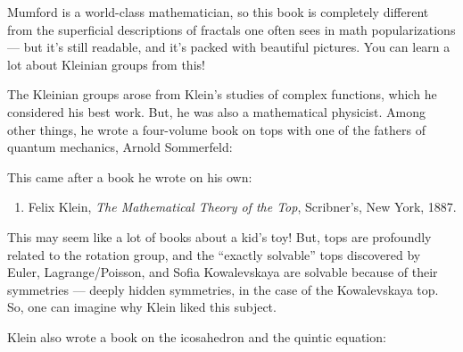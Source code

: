 \documentclass{article}
\def\tightlist{}
\renewcommand{\texttt}[1]{%
  \begingroup
  \ttfamily
  \begingroup\lccode`~=`/\lowercase{\endgroup\def~}{/\discretionary{}{}{}}%
  \begingroup\lccode`~=`[\lowercase{\endgroup\def~}{[\discretionary{}{}{}}%
  \begingroup\lccode`~=`.\lowercase{\endgroup\def~}{.\discretionary{}{}{}}%
  \catcode`/=\active\catcode`[=\active\catcode`.=\active
  \scantokens{#1\noexpand}%
  \endgroup
}
\begin{document}
Mumford is a world-class mathematician, so this book is completely
different from the superficial descriptions of fractals one often sees
in math popularizations --- but it's still readable, and it's packed
with beautiful pictures. You can learn a lot about Kleinian groups from
this!

The Kleinian groups arose from Klein's studies of complex functions,
which he considered his best work. But, he was also a mathematical
physicist. Among other things, he wrote a four-volume book on tops with
one of the fathers of quantum mechanics, Arnold Sommerfeld:


This came after a book he wrote on his own:

\begin{enumerate}
\def\labelenumi{\arabic{enumi})}
\setcounter{enumi}{4}
\tightlist
\item
  Felix Klein, \emph{The Mathematical Theory of the Top}, Scribner's,
  New York, 1887.
\end{enumerate}

This may seem like a lot of books about a kid's toy! But, tops are
profoundly related to the rotation group, and the ``exactly solvable''
tops discovered by Euler, Lagrange/Poisson, and Sofia Kowalevskaya are
solvable because of their symmetries --- deeply hidden symmetries, in
the case of the Kowalevskaya top. So, one can imagine why Klein liked
this subject.

Klein also wrote a book on the icosahedron and the quintic equation:

\end{document}
